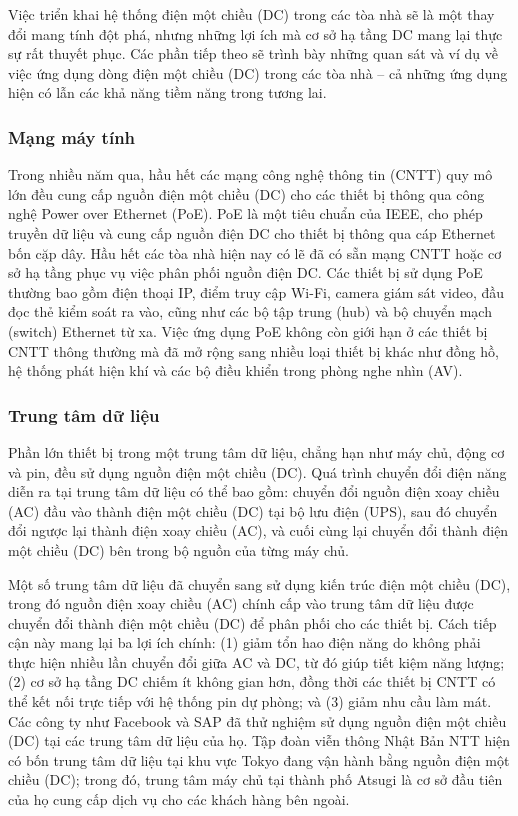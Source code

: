 \documentclass{thesis}
\begin{document}
Việc triển khai hệ thống điện một chiều (DC) trong các tòa nhà sẽ là
một thay đổi mang tính đột phá, nhưng những lợi ích mà cơ sở hạ tầng
DC mang lại thực sự rất thuyết phục. Các phần tiếp theo sẽ trình bày
những quan sát và ví dụ về việc ứng dụng dòng điện một chiều (DC)
trong các tòa nhà – cả những ứng dụng hiện có lẫn các khả năng tiềm
năng trong tương lai.

\subsubsection{Mạng máy tính}

Trong nhiều năm qua, hầu hết các mạng công nghệ thông tin (CNTT) quy
mô lớn đều cung cấp
nguồn điện một chiều (DC) cho các thiết bị thông qua công nghệ Power
over Ethernet (PoE). PoE là một tiêu chuẩn của IEEE, cho phép truyền
dữ liệu và cung cấp nguồn điện DC cho thiết bị thông qua cáp Ethernet
bốn cặp dây. Hầu hết các tòa nhà hiện nay có lẽ đã có sẵn mạng CNTT
hoặc cơ sở hạ tầng phục vụ việc phân phối nguồn điện DC. Các thiết bị
sử dụng PoE thường bao gồm điện thoại IP, điểm truy cập Wi-Fi, camera
giám sát video, đầu đọc thẻ kiểm soát ra vào, cũng như các bộ tập
trung (hub) và bộ chuyển mạch (switch) Ethernet từ xa. Việc ứng dụng
PoE không còn giới hạn ở các thiết bị CNTT thông thường mà đã mở rộng
sang nhiều loại thiết bị khác như đồng hồ, hệ thống phát hiện khí và
các bộ điều khiển trong phòng nghe nhìn (AV).

\subsubsection{Trung tâm dữ liệu}

Phần lớn thiết bị trong một trung tâm dữ liệu, chẳng hạn như máy chủ,
động cơ và pin, đều sử dụng nguồn điện một chiều (DC). Quá trình
chuyển đổi điện năng diễn ra tại trung tâm dữ liệu có thể bao gồm:
chuyển đổi nguồn điện xoay chiều (AC) đầu vào thành điện một chiều
(DC) tại bộ lưu điện (UPS), sau đó chuyển đổi ngược lại thành điện
xoay chiều (AC), và cuối cùng lại chuyển đổi thành điện một chiều
(DC) bên trong bộ nguồn của từng máy chủ.

Một số trung tâm dữ liệu đã chuyển sang sử dụng kiến trúc điện một
chiều (DC), trong đó nguồn điện xoay chiều (AC) chính cấp vào trung
tâm dữ liệu được chuyển đổi thành điện một chiều (DC) để phân phối
cho các thiết bị. Cách tiếp cận này mang lại ba lợi ích chính: (1)
giảm tổn hao điện năng do không phải thực hiện nhiều lần chuyển đổi
giữa AC và DC, từ đó giúp tiết kiệm năng lượng; (2) cơ sở hạ tầng DC
chiếm ít không gian hơn, đồng thời các thiết bị CNTT có thể kết nối
trực tiếp với hệ thống pin dự phòng; và (3) giảm nhu cầu làm mát. Các
công ty như Facebook và SAP đã thử nghiệm sử dụng nguồn điện một
chiều (DC) tại các trung tâm dữ liệu của họ. Tập đoàn viễn thông Nhật
Bản NTT hiện có bốn trung tâm dữ liệu tại khu vực Tokyo đang vận hành
bằng nguồn điện một chiều (DC); trong đó, trung tâm máy chủ tại thành
phố Atsugi là cơ sở đầu tiên của họ cung cấp dịch vụ cho các khách
hàng bên ngoài.
\end{document}
